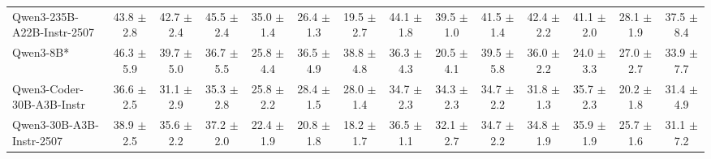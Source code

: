 \begin{table}[t]
{\begin{tabular}{l *{13}{c}}

Qwen3-235B-A22B-Instr-2507 
 & 43.8 {\tiny$\pm$ 2.8} 
 & 42.7 {\tiny$\pm$ 2.4} & 
 45.5 {\tiny$\pm$ 2.4} & 
 35.0 {\tiny$\pm$ 1.4} & 
 26.4 {\tiny$\pm$ 1.3} & 
 19.5 {\tiny$\pm$ 2.7} & 
 44.1 {\tiny$\pm$ 1.8} & 
 39.5 {\tiny$\pm$ 1.0} & 
 41.5 {\tiny$\pm$ 1.4} & 
 42.4 {\tiny$\pm$ 2.2} & 
 41.1 {\tiny$\pm$ 2.0} & 
 28.1 {\tiny$\pm$ 1.9} & 
 37.5 {\tiny$\pm$ 8.4} \\

\rowcolor{gray!10}
 Qwen3-8B* &
46.3 {\tiny$\pm$ 5.9} & 
39.7 {\tiny$\pm$ 5.0} & 
36.7 {\tiny$\pm$ 5.5} & 
25.8 {\tiny$\pm$ 4.4} &
36.5 {\tiny$\pm$ 4.9} & 
38.8 {\tiny$\pm$ 4.8} & 
36.3 {\tiny$\pm$ 4.3} & 
20.5 {\tiny$\pm$ 4.1} &
39.5 {\tiny$\pm$ 5.8} & 
36.0 {\tiny$\pm$ 2.2} & 
24.0 {\tiny$\pm$ 3.3} & 
27.0 {\tiny$\pm$ 2.7} &
33.9 {\tiny$\pm$ 7.7} \\


Qwen3-Coder-30B-A3B-Instr
 & 36.6 {\tiny$\pm$ 2.5} & 
 31.1 {\tiny$\pm$ 2.9} & 
 35.3 {\tiny$\pm$ 2.8} & 
 25.8 {\tiny$\pm$ 2.2} & 
 28.4 {\tiny$\pm$ 1.5} & 
 28.0 {\tiny$\pm$ 1.4} & 
 34.7 {\tiny$\pm$ 2.3} & 
 34.3 {\tiny$\pm$ 2.3} & 
 34.7 {\tiny$\pm$ 2.2} & 
 31.8 {\tiny$\pm$ 1.3} & 
 35.7 {\tiny$\pm$ 2.3} & 
 20.2 {\tiny$\pm$ 1.8} & 
 31.4 {\tiny$\pm$ 4.9} \\

\rowcolor{gray!10}
Qwen3-30B-A3B-Instr-2507
 & 38.9 {\tiny$\pm$ 2.5} & 
 35.6 {\tiny$\pm$ 2.2} & 
 37.2 {\tiny$\pm$ 2.0} & 
 22.4 {\tiny$\pm$ 1.9} & 
 20.8 {\tiny$\pm$ 1.8} & 
 18.2 {\tiny$\pm$ 1.7} & 
 36.5 {\tiny$\pm$ 1.1} & 
 32.1 {\tiny$\pm$ 2.7} & 
 34.7 {\tiny$\pm$ 2.2} & 
 34.8 {\tiny$\pm$ 1.9} & 
 35.9 {\tiny$\pm$ 1.9} & 
 25.7 {\tiny$\pm$ 1.6} & 
 31.1 {\tiny$\pm$ 7.2} \\



\end{tabular}}
\end{table}
